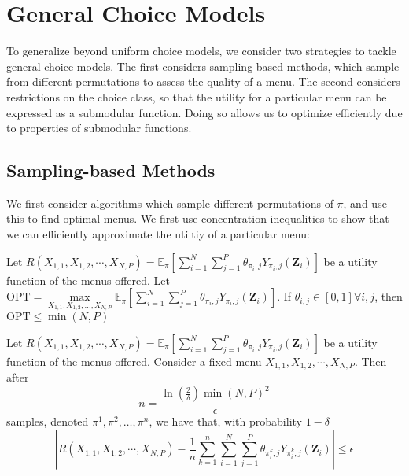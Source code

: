 \section{General Choice Models}
To generalize beyond uniform choice models, we consider two strategies to tackle general choice models.
The first considers sampling-based methods, which sample from different permutations to assess the quality of a menu. 
The second considers restrictions on the choice class, so that the utility for a particular menu can be expressed as a submodular function. 
Doing so allows us to optimize efficiently due to properties of submodular functions. 

\subsection{Sampling-based Methods}
We first consider algorithms which sample different permutations of $\pi$, and use this to find optimal menus. 
We first use concentration inequalities to show that we can efficiently approximate the utiltiy of a particular menu: 
\begin{lemma}
     Let $R(X_{1,1},X_{1,2},\cdots,X_{N,P}) = \mathbb{E}_{\pi}[\sum_{i=1}^{N} \sum_{j=1}^{P} \theta_{\pi_{i},j} Y_{\pi_{i},j}(\mathbf{Z}_{i})]$ be a utility function of the menus offered. Let $\mathrm{OPT} = \max\limits_{X_{1,1},X_{1,2},\ldots,X_{N,P}} \mathbb{E}_{\pi}[\sum_{i=1}^{N} \sum_{j=1}^{P} \theta_{\pi_{i},j} Y_{\pi_{i},j}(\mathbf{Z}_{i})]$. If $\theta_{i,j} \in [0,1] \forall i,j$, then $\mathrm{OPT} \leq \min(N,P)$
\end{lemma}

\begin{lemma}
    Let $R(X_{1,1},X_{1,2},\cdots,X_{N,P}) = \mathbb{E}_{\pi}[\sum_{i=1}^{N} \sum_{j=1}^{P} \theta_{\pi_{i},j} Y_{\pi_{i},j}(\mathbf{Z}_{i})]$ be a utility function of the menus offered.
    Consider a fixed menu $X_{1,1},X_{1,2},\cdots,X_{N,P}$. 
    Then after 
    \begin{equation}
        n = \frac{\ln(\frac{2}{\delta}) \min(N,P)^{2}}{\epsilon}
    \end{equation}
    samples, denoted $\pi^{1}, \pi^{2}, \ldots, \pi^{n}$, we have that, with probability $1-\delta$
    \begin{equation}
        |R(X_{1,1},X_{1,2},\cdots,X_{N,P}) - \frac{1}{n} \sum_{k=1}^{n} \sum_{i=1}^{N} \sum_{j=1}^{P} \theta_{\pi^{k}_{i},j} Y_{\pi^{k}_{i},j}(\mathbf{Z}_{i})| \leq \epsilon
    \end{equation}
\end{lemma}

